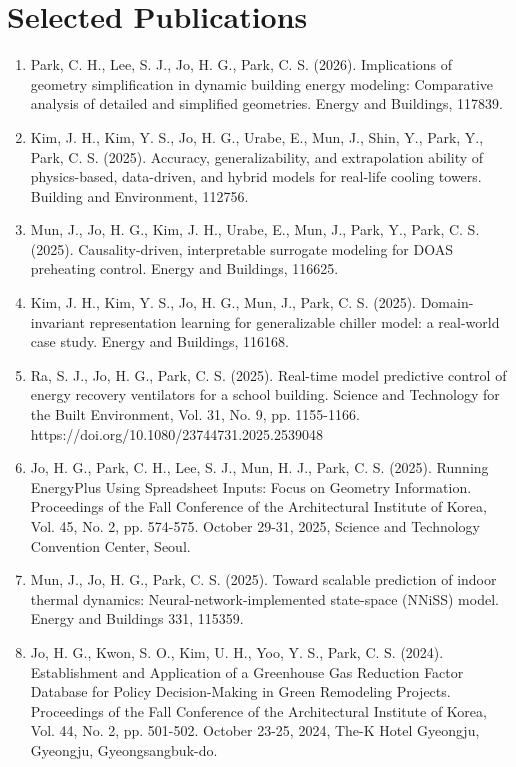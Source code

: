 \documentclass[10pt,a4paper]{article}
\begin{document}
\section*{Selected Publications}
\begin{enumerate}[leftmargin=*]
\item Park, C. H., Lee, S. J., Jo, H. G., Park, C. S. (2026). Implications of geometry simplification in dynamic building energy modeling: Comparative analysis of detailed and simplified geometries. Energy and Buildings, 117839.
\item Kim, J. H., Kim, Y. S., Jo, H. G., Urabe, E., Mun, J., Shin, Y., Park, Y., Park, C. S. (2025). Accuracy, generalizability, and extrapolation ability of physics-based, data-driven, and hybrid models for real-life cooling towers. Building and Environment, 112756.
\item Mun, J., Jo, H. G., Kim, J. H., Urabe, E., Mun, J., Park, Y., Park, C. S. (2025). Causality-driven, interpretable surrogate modeling for DOAS preheating control. Energy and Buildings, 116625.
\item Kim, J. H., Kim, Y. S., Jo, H. G., Mun, J., Park, C. S. (2025). Domain-invariant representation learning for generalizable chiller model: a real-world case study. Energy and Buildings, 116168.
\item Ra, S. J., Jo, H. G., Park, C. S. (2025). Real-time model predictive control of energy recovery ventilators for a school building. Science and Technology for the Built Environment, Vol. 31, No. 9, pp. 1155-1166. https://doi.org/10.1080/23744731.2025.2539048
\item Jo, H. G., Park, C. H., Lee, S. J., Mun, H. J., Park, C. S. (2025). Running EnergyPlus Using Spreadsheet Inputs: Focus on Geometry Information. Proceedings of the Fall Conference of the Architectural Institute of Korea, Vol. 45, No. 2, pp. 574-575. October 29-31, 2025, Science and Technology Convention Center, Seoul.
\item Mun, J., Jo, H. G., Park, C. S. (2025). Toward scalable prediction of indoor thermal dynamics: Neural-network-implemented state-space (NNiSS) model. Energy and Buildings 331, 115359.
\item Jo, H. G., Kwon, S. O., Kim, U. H., Yoo, Y. S., Park, C. S. (2024). Establishment and Application of a Greenhouse Gas Reduction Factor Database for Policy Decision-Making in Green Remodeling Projects. Proceedings of the Fall Conference of the Architectural Institute of Korea, Vol. 44, No. 2, pp. 501-502. October 23-25, 2024, The-K Hotel Gyeongju, Gyeongju, Gyeongsangbuk-do.

\end{enumerate}
\end{document}
